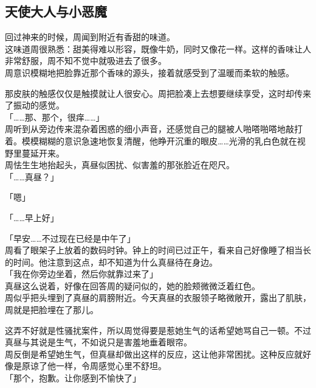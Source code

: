 \subsection{天使大人与小恶魔}

回过神来的时候，周闻到附近有香甜的味道。\\

这味道周很熟悉：甜美得难以形容，既像牛奶，同时又像花一样。这样的香味让人非常舒服，周不知不觉中就吸进去了很多。\\

周意识模糊地把脸靠近那个香味的源头，接着就感受到了温暖而柔软的触感。

那皮肤的触感仅仅是触摸就让人很安心。周把脸凑上去想要继续享受，这时却传来了振动的感觉。\\

「……那、那个，很痒……」\\

周听到从旁边传来混杂着困惑的细小声音，还感觉自己的腿被人啪嗒啪嗒地敲打着。模模糊糊的意识急速地恢复清醒，他睁开沉重的眼皮……光滑的乳白色就在视野里蔓延开来。\\

周怯生生地抬起头，真昼似困扰、似害羞的那张脸近在咫尺。\\

「……真昼？」

「嗯」

「……早上好」

「早安……不过现在已经是中午了」\\

周看了眼架子上放着的数码时钟。钟上的时间已过正午，看来自己好像睡了相当长的时间。他注意到这点，却不知道为什么真昼待在身边。\\

「我在你旁边坐着，然后你就靠过来了」\\

真昼这么说着，好像在回答周的疑问似的，她的脸颊微微泛着红色。\\

周似乎把头埋到了真昼的肩膀附近。今天真昼的衣服领子略微敞开，露出了肌肤，周就是把脸埋在了那儿。

这弄不好就是性骚扰案件，所以周觉得要是惹她生气的话希望她骂自己一顿。不过真昼与其说是生气，不如说只是害羞地垂着眼帘。\\

周反倒是希望她生气，但真昼却做出这样的反应，这让他非常困扰。这种反应就好像是原谅了他一样，令周感觉心里不舒坦。\\

「那个，抱歉。让你感到不愉快了」

